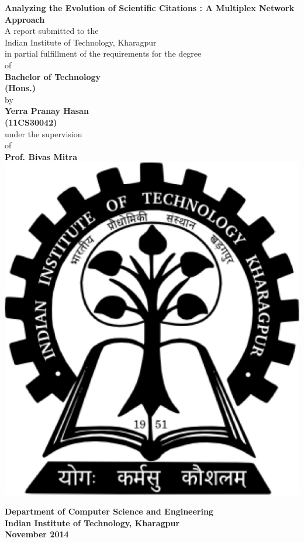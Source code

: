 \thispagestyle{empty}
\begin{center}

\textbf{\LARGE Analyzing the Evolution of Scientific Citations : A Multiplex Network Approach}\\[2em]

A report submitted to the\\[-0.5em]
Indian Institute of Technology, Kharagpur\\[-0.5em]
in partial fulfillment of the requirements for the degree\\[0.6em]
of\\[0.6em]

\textbf{Bachelor of Technology}\\[-0.5em]
\textbf{(Hons.)}\\[1em]

by\\[-0.3em]
\textbf{\large Yerra Pranay Hasan}\\[-0.3em]
\textbf{\large (11CS30042)}\\[1em]

under the supervision\\[-0.5em]
of\\[-0.3em]
\textbf{\large Prof. Bivas Mitra}\\

\vspace{2em}
\includegraphics[scale=0.3]{kgp-logo.pdf}
\vspace{2em}

\textbf{Department of Computer Science and Engineering}\\[-0.5em]
\textbf{Indian Institute of Technology, Kharagpur}\\[1em]
\textbf{November 2014}

\end{center}
